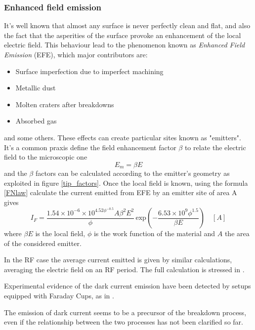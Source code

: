 \subsubsection{Enhanced field emission}

It's well known that almost any surface is never perfectly clean and flat, and also the fact that the asperities of the surface provoke an enhancement of the local electric field. This behaviour lead to the phenomenon known as \textit{Enhanced Field Emission} (EFE), which major contributors are:
\begin{itemize}
\item Surface imperfection due to imperfect machining
\item Metallic dust
\item Molten craters after breakdowns
\item Absorbed gas
\end{itemize} 
and some others. These effects can create particular sites known as "emitters". It's a common praxis define the field enhancement factor $\beta$ to relate the electric field to the microscopic one
\begin{equation}
E_{m} = \beta E
\end{equation}
and the $\beta$ factors can be calculated according to the emitter's geometry \cite{Rohrbach:190223} as exploited in figure \ref{tip_factors}.
Once the local field is known, using the formula \ref{FNlaw} calculate the current emitted from EFE by an emitter site of area A gives 
\begin{equation}
I_F = \frac{ 1.54\times10^{-6} \times 10^{4.52\phi^{-0.5}} A \beta^2 E^2}{  \phi } \, \text{exp} \left ( -\frac{6.53\times 10^9 \phi^{1.5}}{\beta E} \right ) \quad [A]  \label{If}
\end{equation}
where $\beta E$ is the local field, $\phi$ is the work function of the material and $A$ the area of the considered emitter.

 In the RF case the average current emitted is given by similar calculations, averaging the electric field on an RF period. The full calculation is stressed in \cite{Wang:1997ip}. 

Experimental evidence of the dark current emission have been detected by setups equipped with Faraday Cups, as in \cite{Wuensch:advaces}.

The emission of dark current seems to be a precursor of the breakdown  process, even if the relationship between the two processes has not been clarified so far.

